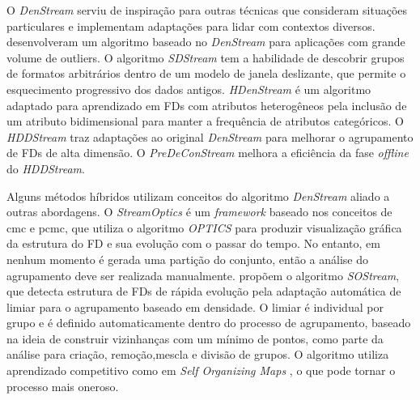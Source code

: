 O \emph{DenStream} serviu de inspiração para outras técnicas que consideram situações particulares e implementam adaptações para lidar com contextos diversos.  desenvolveram um algoritmo baseado no \emph{DenStream} para aplicações com grande volume de outliers. %
O algoritmo \emph{SDStream} \cite{Ren2009}  tem a habilidade de descobrir grupos de formatos arbitrários dentro de um modelo de janela deslizante, que permite o esquecimento progressivo dos dados antigos. %
\emph{HDenStream} \cite{Lin2009} é um algoritmo adaptado para aprendizado em FDs com atributos heterogêneos pela inclusão de um atributo bidimensional para manter a frequência de atributos categóricos. %
O \emph{HDDStream} \cite{Ntoutsi2012} traz adaptações ao original \emph{DenStream} para melhorar o agrupamento de FDs de alta dimensão. O \emph{PreDeConStream} \cite{Hassani2012} melhora a eficiência da fase \emph{offline} do \emph{HDDStream}.

Alguns métodos híbridos utilizam conceitos do algoritmo \emph{DenStream} aliado a outras abordagens. O \emph{StreamOptics} \cite{Tasoulis2007} é um \emph{framework} baseado nos conceitos de cmc e pcmc, que utiliza o algoritmo \emph{OPTICS} \cite{Ankerst1999} para produzir visualização gráfica da estrutura do FD e sua evolução com o passar do tempo. No entanto, em nenhum momento é gerada uma partição do conjunto, então a análise do agrupamento deve ser realizada manualmente.  propõem o algoritmo \emph{SOStream}, que detecta estrutura de FDs de rápida evolução pela adaptação automática de limiar para o agrupamento baseado em densidade. O limiar é individual por grupo e é definido automaticamente dentro do processo de agrupamento, baseado na ideia de construir vizinhanças com um mínimo de pontos, como parte da análise para criação, remoção,mescla e divisão de grupos. O algoritmo utiliza aprendizado competitivo como em \emph{Self Organizing Maps} \cite{Kohonen1982}, o que pode tornar o processo mais oneroso.

